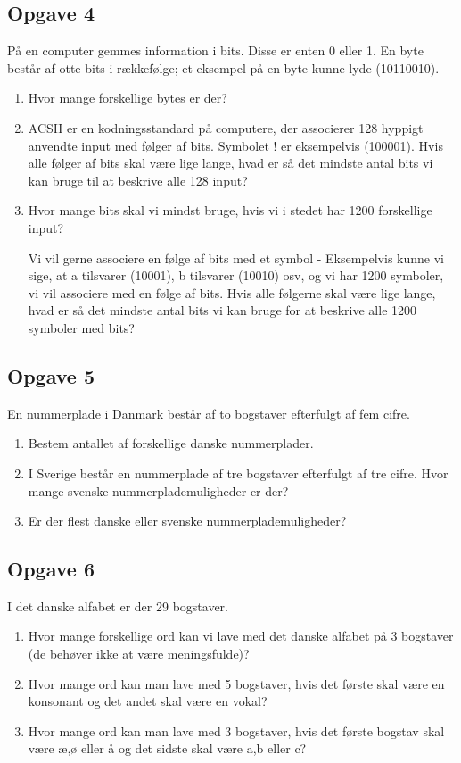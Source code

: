 \subsection*{Opgave 4}
På en computer gemmes information i bits. Disse er enten 0 eller 1. En byte består af otte bits i rækkefølge; et eksempel på en byte kunne lyde (10110010).
\begin{enumerate}[label=\roman*)]
\item Hvor mange forskellige bytes er der?
\item ACSII er en kodningsstandard på computere, der associerer 128 hyppigt anvendte input med følger af bits. Symbolet ! er eksempelvis (100001). Hvis alle følger af bits skal være lige lange, hvad er så det mindste antal bits vi kan bruge til at beskrive alle 128 input? 
\item Hvor mange bits skal vi mindst bruge, hvis vi i stedet har 1200 forskellige input?

Vi vil gerne associere en følge af bits med et symbol - Eksempelvis kunne vi sige, at a tilsvarer (10001), b tilsvarer (10010) osv, og vi har 1200 symboler, vi vil associere med en følge af bits. Hvis alle følgerne skal være lige lange, hvad er så det mindste antal bits vi kan bruge for at beskrive alle 1200 symboler med bits?
\end{enumerate}

\subsection*{Opgave 5}
En nummerplade i Danmark består af to bogstaver efterfulgt af fem cifre. 
\begin{enumerate}[label=\roman*)]
\item Bestem antallet af forskellige danske nummerplader.
\item I Sverige består en nummerplade af tre bogstaver efterfulgt af tre cifre. Hvor mange svenske nummerplademuligheder er der?
\item Er der flest danske eller svenske nummerplademuligheder?
\end{enumerate}

\subsection*{Opgave 6}
I det danske alfabet er der 29 bogstaver. 
\begin{enumerate}[label=\roman*)]
	\item Hvor mange forskellige ord kan vi lave med det danske alfabet på 3 bogstaver (de behøver ikke at være meningsfulde)?
	\item Hvor mange ord kan man lave med 5 bogstaver, hvis det første skal være en konsonant og det andet skal være en vokal?
	\item Hvor mange ord kan man lave med 3 bogstaver, hvis det første bogstav skal være æ,ø eller å og det sidste skal være a,b eller c?
\end{enumerate}

